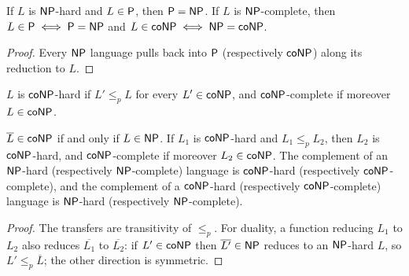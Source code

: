 \begin{theorem}
  \label{thm:polytime-np-complete-collapse}
  \leanok
  If $L$ is $\mathsf{NP}$-hard and $L \in \mathsf{P}$, then $\mathsf{P} = \mathsf{NP}$. If $L$
  is $\mathsf{NP}$-complete, then $L \in \mathsf{P} \iff \mathsf{P} = \mathsf{NP}$ and
  $L \in \mathsf{coNP} \iff \mathsf{NP} = \mathsf{coNP}$.
\end{theorem}
\begin{proof}
  \leanok
  Every $\mathsf{NP}$ language pulls back into $\mathsf{P}$ (respectively
  $\mathsf{coNP}$) along its reduction to $L$.
\end{proof}

\begin{definition}
  \label{def:polytime-conp-complete}
  \leanok
  $L$ is $\mathsf{coNP}$-hard if $L' \le_p L$ for every $L' \in \mathsf{coNP}$, and
  $\mathsf{coNP}$-complete if moreover $L \in \mathsf{coNP}$.
\end{definition}

\begin{lemma}
  \label{lem:polytime-conp-dual}
  \leanok
  $\overline{L} \in \mathsf{coNP}$ if and only if $L \in \mathsf{NP}$. If $L_1$ is
  $\mathsf{coNP}$-hard and $L_1 \le_p L_2$, then $L_2$ is $\mathsf{coNP}$-hard, and
  $\mathsf{coNP}$-complete if moreover $L_2 \in \mathsf{coNP}$. The complement of an
  $\mathsf{NP}$-hard (respectively $\mathsf{NP}$-complete) language is
  $\mathsf{coNP}$-hard (respectively $\mathsf{coNP}$-complete), and the complement of
  a $\mathsf{coNP}$-hard (respectively $\mathsf{coNP}$-complete) language is
  $\mathsf{NP}$-hard (respectively $\mathsf{NP}$-complete).
\end{lemma}
\begin{proof}
  \leanok
  The transfers are transitivity of $\le_p$. For duality, a function reducing
  $L_1$ to $L_2$ also reduces $\overline{L_1}$ to $\overline{L_2}$: if
  $L' \in \mathsf{coNP}$ then $\overline{L'} \in \mathsf{NP}$ reduces to an
  $\mathsf{NP}$-hard $L$, so $L' \le_p \overline{L}$; the other direction is
  symmetric.
\end{proof}

